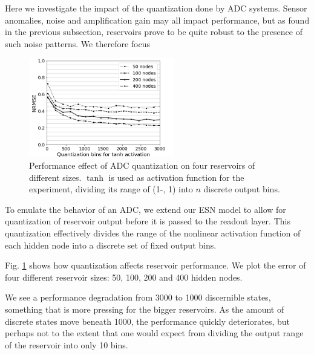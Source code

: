 Here we investigate the impact of the quantization done by ADC systems. Sensor
anomalies, noise and amplification gain may all impact performance, but as found
in the previous subsection, reservoirs prove to be quite robust to the presence
of such noise patterns. We therefore focus 

\begin{figure}[H]
  \centering
  \includegraphics[width=2.5in]{img/adc_quantization.png}
  \caption{
    Performance effect of ADC quantization on four reservoirs of different
sizes. $\tanh$ is used as activation function for the experiment, dividing its
range of (1-, 1) into $n$ discrete output bins.
  }
  \label{adc_quantization}
\end{figure}

To emulate the behavior of an ADC, we extend our ESN model to allow for
quantization of reservoir output before it is passed to the readout layer. This
quantization effectively divides the range of the nonlinear activation function
of each hidden node into a discrete set of fixed output bins.

Fig. \ref{adc_quantization} shows how quantization affects reservoir
performance. We plot the error of four different reservoir sizes: 50, 100, 200
and 400 hidden nodes.

We see a performance degradation from 3000 to 1000 discernible states, something
that is more pressing for the bigger reservoirs. As the amount of discrete
states move beneath 1000, the performance quickly deteriorates, but perhaps not
to the extent that one would expect from dividing the output range of the
reservoir into only 10 bins.



